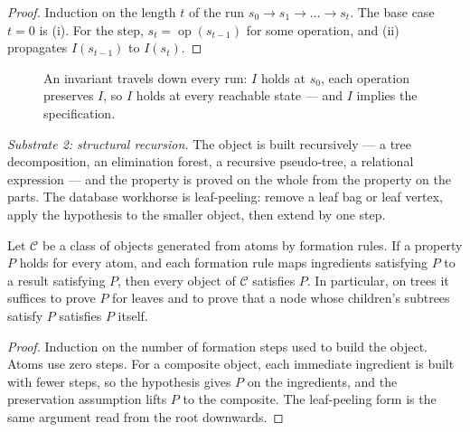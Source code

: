 \begin{proof}
Induction on the length $t$ of the run $s_0 \to s_1 \to \dots \to s_t$. The base case
$t=0$ is (i). For the step, $s_t = \operatorname{op}(s_{t-1})$ for some operation, and
(ii) propagates $I(s_{t-1})$ to $I(s_t)$.
\end{proof}

\begin{figure}[t]
\centering
{}
\caption{An invariant travels down every run: $I$ holds at $s_0$, each operation
preserves $I$, so $I$ holds at every reachable state --- and $I$ implies the
specification.}
\label{fig:ind-chain}
\end{figure}

\emph{Substrate 2: structural recursion.} The object is built recursively --- a tree
decomposition, an elimination forest, a recursive pseudo-tree, a relational expression
--- and the property is proved on the whole from the property on the parts. The
database workhorse is leaf-peeling: remove a leaf bag or leaf vertex, apply the
hypothesis to the smaller object, then extend by one step.

\begin{proposition}\label{prop:ind-structural}
Let $\mathcal{C}$ be a class of objects generated from atoms by formation rules. If a
property $P$ holds for every atom, and each formation rule maps ingredients satisfying
$P$ to a result satisfying $P$, then every object of $\mathcal{C}$ satisfies $P$. In
particular, on trees it suffices to prove $P$ for leaves and to prove that a node whose
children's subtrees satisfy $P$ satisfies $P$ itself.
\end{proposition}

\begin{proof}
Induction on the number of formation steps used to build the object. Atoms use zero
steps. For a composite object, each immediate ingredient is built with fewer steps, so
the hypothesis gives $P$ on the ingredients, and the preservation assumption lifts $P$
to the composite. The leaf-peeling form is the same argument read from the root
downwards.
\end{proof}

